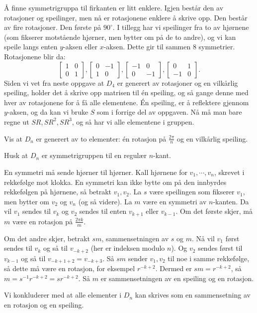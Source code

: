 \documentclass[11pt, norsk]{article}
\begin{document}
\begin{losn}
Å finne symmetrigruppa til firkanten er litt enklere. Igjen består den av rotasjoner og speilinger, men nå er rotasjonene enklere å skrive opp. Den består av fire rotasjoner. Den første på $90^\circ$. I tillegg har vi speilinger fra to av hjørnene (som fikserer motstående hjørner, men bytter om på de to andre), og vi kan speile langs enten $y$-aksen eller $x$-aksen. Dette gir til sammen $8$ symmetrier. Rotasjonene blir da:
\[
\begin{bmatrix}
1 & 0 \\ 0 & 1
\end{bmatrix},
\begin{bmatrix}
 0 & -1 \\ 1 & 0 
\end{bmatrix},
\begin{bmatrix}
  -1 & 0 \\ 0 & -1
\end{bmatrix},
\begin{bmatrix}
0 & 1 \\ -1 & 0
\end{bmatrix}.
\]
Siden vi vet fra neste oppgave at $D_4$ er generert av rotasjoner og en vilkårlig speiling, holder det å skrive opp matrisen til én speiling, og så gange denne med hver av rotasjonene for å få alle elementene. Én speiling, er å reflektere gjennom $y$-aksen, og da kan vi bruke $S$ som i forrige del av oppgaven. Nå må man bare regne ut $SR,SR^2,SR^3$, og så har vi alle elementene i gruppen.
\end{losn}
\begin{oppg}
Vis at $D_n$ er generert av to elementer: én rotasjon på $\frac {2\pi}n$ og en vilkårlig speiling.  
\end{oppg}
\begin{losn}
Husk at $D_n$ er symmetrigruppen til en regulær $n$-kant.

En symmetri må sende hjørner til hjørner. Kall hjørnene for $v_1,\cdots,v_n$, skrevet i rekkefølge mot klokka. En symmetri kan ikke bytte om på den innbyrdes rekkefølgen på hjørnene, så betrakt $v_1, v_2$. La $s$ være speilingen som fikserer $v_1$, men bytter om $v_2$ og $v_n$ (og så videre). La $m$ være en symmetri av $n$-kanten. Da vil $v_1$ sendes til $v_k$ og $v_2$ sendes til enten $v_{k+1}$ eller $v_{k-1}$. Om det første skjer, må $m$ være en rotasjon på $\frac{2\pi k}m$.

Om det andre skjer, betrakt $sm$, sammensetningen av $s$ og $m$. Nå vil $v_1$ først sendes til $v_k$ og så til $v_{-k+2}$ (her er indeksen modulo $n$). Og $v_2$ sendes først til $v_{k-1}$ og så til $v_{-k+1+2}=v_{-k+3}$. Så $sm$ sender $v_1,v_2$ til noe i samme rekkefølge, så dette må være en rotasjon, for eksempel $r^{-k+2}$. Dermed er $sm=r^{-k+2}$, så $m=s^{-1}r^{-k+2}=sr^{-k+2}$. Så $m$ er sammensetningen av en speiling og en rotasjon.

Vi konkluderer med at alle elementer i $D_n$ kan skrives som en sammensetning av en rotasjon og en speiling.
\end{losn}
\end{document}
